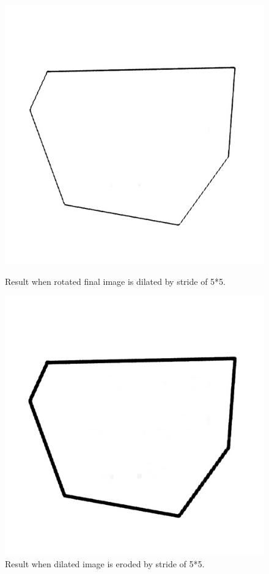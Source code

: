             \begin{figure}[h]
                \centering
                \begin{minipage}{.45\textwidth}
                    \centering
                    \includegraphics[width=.8\linewidth,frame]{img/experiment/dataset/3dilate_img.jpg}
                    \caption{Result when rotated final image is dilated by stride of 5*5.}
                    \label{fig:dataset-final-dilated}
                \end{minipage}%
                \hfill
                \begin{minipage}{.45\textwidth}
                    \centering
                    \includegraphics[width=.8\linewidth,frame]{img/experiment/dataset/4erode_img.jpg}
                    \caption{Result when dilated image is eroded by stride of 5*5.}
                    \label{fig:dataset-final-eroded}
                \end{minipage}
            \end{figure}    
